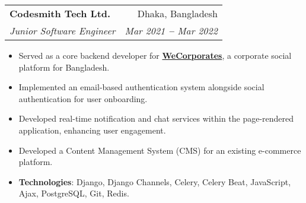 \documentclass[letterpaper,11pt]{article}
\makeatletter
\newcommand{\resumeItem}[1]{
  \item\small{
    {#1 \vspace{-2pt}}
  }
}
\newcommand{\resumeSubheading}[4]{
  \vspace{-2pt}\item
    \begin{tabular*}{0.97\textwidth}[t]{l@{\extracolsep{\fill}}r}
      \textbf{#1} & #2 \\
      \textit{\small#3} & \textit{\small #4} \\
    \end{tabular*}\vspace{-7pt}
}
\newcommand{\resumeItemListStart}{\begin{itemize}}
\newcommand{\resumeItemListEnd}{\end{itemize}\vspace{-5pt}}
\makeatother
\begin{document}
    \resumeSubheading
      {Codesmith Tech Ltd.}{Dhaka, Bangladesh}
      {Junior Software Engineer}{Mar 2021 \textbf{--} Mar 2022}
        \resumeItemListStart
            \resumeItem{Served as a core backend developer for \textbf{\href{https://wecorporates.com/}{WeCorporates}}, a corporate social platform for Bangladesh.}
            \resumeItem{Implemented an email-based authentication system alongside social authentication for user onboarding.}
            \resumeItem{Developed real-time notification and chat services within the page-rendered application, enhancing user engagement.}
            \resumeItem{Developed a Content Management System (CMS) for an existing e-commerce platform.}
            \resumeItem{\textbf{Technologies}: Django, Django Channels, Celery, Celery Beat, JavaScript, Ajax, PostgreSQL, Git, Redis.}
        \resumeItemListEnd
    

    
\end{document}
